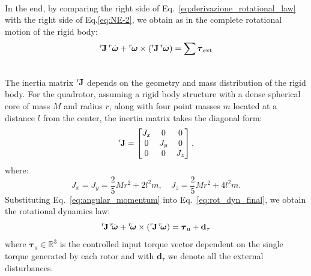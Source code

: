 \noindent\\
In the end, by comparing the right side of Eq.~\eqref{eq:derivazione_rotational_law}
with the right side of Eq.\ref{eq:NE-2}, we obtain as in \cite{control_quadrotor_main}
the complete rotational motion of the rigid body:
\begin{equation}
    {}^r\mkern-3mu\mathbf{J} \, {}^r\dot{\boldsymbol{\omega}} +
    {}^r\mkern-2mu\boldsymbol{\omega} \times ({}^r\mkern-3mu\mathbf{J} \, {}^r\mkern-2mu\dot{\boldsymbol{\omega}})
     = \sum \boldsymbol{\tau}_{\text{ext}}
    \label{eq:rot_dyn_final}
\end{equation}

\noindent\\
The inertia matrix \( {}^r\mkern-3mu\mathbf{J} \) depends on the geometry and mass distribution of the rigid body. 
For the quadrotor, assuming a rigid body structure with a dense spherical core of mass \( M \) and radius \( r \), 
along with four point masses \( m \) located at a distance \( l \) from the center, 
the inertia matrix takes the diagonal form:
\[
{}^r\mkern-3mu\mathbf{J} = 
\begin{bmatrix}
J_x & 0 & 0 \\
0 & J_y & 0 \\
0 & 0 & J_z
\end{bmatrix},
\]
where:
\[
J_x = J_y = \frac{2}{5} M r^2 + 2 l^2 m, \quad J_z = \frac{2}{5} M r^2 + 4 l^2 m.
\]
\noindent
Substituting Eq.~\eqref{eq:angular_momentum} into Eq.~\eqref{eq:rot_dyn_final}, we obtain the 
rotational dynamics law:
\begin{equation}
    {}^r\mkern-3mu\mathbf{J} \, {}^r\mkern-4mu\dot{\boldsymbol{\omega}} + {}^r\mkern-4mu\boldsymbol{\omega} \times 
    ({}^r\mkern-3mu\mathbf{J} \, {}^r\mkern-4mu\boldsymbol{\omega}) = \boldsymbol{\tau}_{\text{u}} + \mathbf{d}_{\tau}
    \label{eq:rotational_dynamics}
\end{equation}
where $\boldsymbol{\tau}_{\text{u}} \in \mathbb{R}^3$ is the controlled input
torque vector dependent on the single torque generated
by each rotor and with $\mathbf{d}_{\tau}$ we denote 
all the external disturbances.

